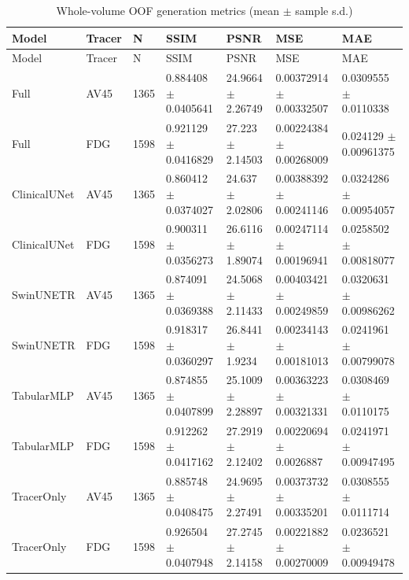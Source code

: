 \documentclass{article}
\begin{document}
\begin{landscape}
\begingroup
\footnotesize
\setlength{\tabcolsep}{4pt}
\begin{longtable}{lllllll}
\caption{{\color{blue}Whole-volume OOF generation metrics (mean $\pm$ sample s.d.)}}\label{tab:whole_volume_generation}\\
\toprule
Model & Tracer & N & SSIM & PSNR & MSE & MAE \\
\midrule
\endfirsthead
\toprule
Model & Tracer & N & SSIM & PSNR & MSE & MAE \\
\midrule
\endhead
\bottomrule
\endfoot
Full & AV45 & 1365 & 0.884408 \(\pm\) 0.0405641 & 24.9664 \(\pm\) 2.26749 & 0.00372914 \(\pm\) 0.00332507 & 0.0309555 \(\pm\) 0.0110338 \\
Full & FDG & 1598 & 0.921129 \(\pm\) 0.0416829 & 27.223 \(\pm\) 2.14503 & 0.00224384 \(\pm\) 0.00268009 & 0.024129 \(\pm\) 0.00961375 \\
ClinicalUNet & AV45 & 1365 & 0.860412 \(\pm\) 0.0374027 & 24.637 \(\pm\) 2.02806 & 0.00388392 \(\pm\) 0.00241146 & 0.0324286 \(\pm\) 0.00954057 \\
ClinicalUNet & FDG & 1598 & 0.900311 \(\pm\) 0.0356273 & 26.6116 \(\pm\) 1.89074 & 0.00247114 \(\pm\) 0.00196941 & 0.0258502 \(\pm\) 0.00818077 \\
SwinUNETR & AV45 & 1365 & 0.874091 \(\pm\) 0.0369388 & 24.5068 \(\pm\) 2.11433 & 0.00403421 \(\pm\) 0.00249859 & 0.0320631 \(\pm\) 0.00986262 \\
SwinUNETR & FDG & 1598 & 0.918317 \(\pm\) 0.0360297 & 26.8441 \(\pm\) 1.9234 & 0.00234143 \(\pm\) 0.00181013 & 0.0241961 \(\pm\) 0.00799078 \\
TabularMLP & AV45 & 1365 & 0.874855 \(\pm\) 0.0407899 & 25.1009 \(\pm\) 2.28897 & 0.00363223 \(\pm\) 0.00321331 & 0.0308469 \(\pm\) 0.0110175 \\
TabularMLP & FDG & 1598 & 0.912262 \(\pm\) 0.0417162 & 27.2919 \(\pm\) 2.12402 & 0.00220694 \(\pm\) 0.0026887 & 0.0241971 \(\pm\) 0.00947495 \\
TracerOnly & AV45 & 1365 & 0.885748 \(\pm\) 0.0408475 & 24.9695 \(\pm\) 2.27491 & 0.00373732 \(\pm\) 0.00335201 & 0.0308555 \(\pm\) 0.0111714 \\
TracerOnly & FDG & 1598 & 0.926504 \(\pm\) 0.0407948 & 27.2745 \(\pm\) 2.14158 & 0.00221882 \(\pm\) 0.00270009 & 0.0236521 \(\pm\) 0.00949478 \\

\end{longtable}
\end{landscape}
\end{document}
